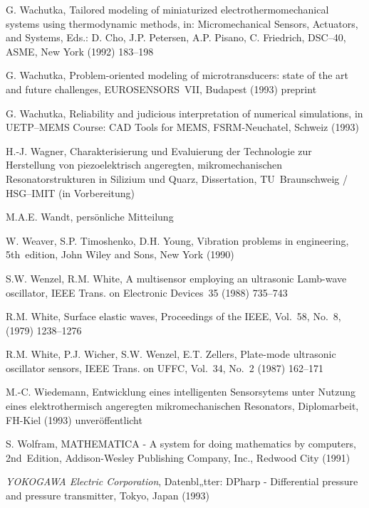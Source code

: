 \begin{thebibliography}{xxx}
 G. Wachutka, Tailored modeling of miniaturized electrothermomechanical
 systems using thermodynamic methods, in: Micromechanical Sensors,
 Actuators, and Systems, Eds.: D. Cho, J.P. Petersen, A.P. Pisano,
 C. Friedrich, DSC--40, ASME, New York (1992) 183--198

 G. Wachutka, Problem-oriented modeling of microtransducers: state of the
 art and future challenges, EUROSENSORS~VII, Budapest (1993) preprint

  G. Wachutka, Reliability and judicious interpretation of numerical
  simulations, in UETP--MEMS Course: CAD Tools for MEMS, FSRM-Neuchatel,
  Schweiz (1993)

 H.-J. Wagner, Charakterisierung und Evaluierung der Technologie zur
 Herstellung von piezoelektrisch angeregten, mikromechanischen
 Resonatorstrukturen in Silizium und Quarz, Dissertation,
 TU~Braunschweig / HSG--IMIT (in Vorbereitung)

 M.A.E. Wandt, persönliche Mitteilung

 W. Weaver, S.P. Timoshenko, D.H. Young, Vibration problems in engineering,
 5th~edition, John Wiley and Sons, New York (1990)

 S.W. Wenzel, R.M. White, A multisensor employing an ultrasonic Lamb-wave
 oscillator, IEEE Trans. on Electronic Devices~35 (1988) 735--743

 R.M. White, Surface elastic waves, Proceedings of the IEEE, Vol.~58, No.~8,
 (1979) 1238--1276

 R.M. White, P.J. Wicher, S.W. Wenzel, E.T. Zellers, Plate-mode ultrasonic
 oscillator sensors, IEEE Trans. on UFFC, Vol.~34, No.~2 (1987) 162--171

 M.-C. Wiedemann, Entwicklung eines intelligenten Sensorsytems unter Nutzung
 eines elektrothermisch angeregten mikromechanischen Resonators,
 Diplomarbeit, FH-Kiel (1993) unveröffentlicht

 S. Wolfram, {\sf MATHEMATICA} - A system for doing mathematics by computers,
 2nd~Edition, Addison-Wesley Publishing Company, Inc., Redwood City (1991)

 {\em YOKOGAWA Electric Corporation}, Datenbl„tter: {\sf DPharp} -
 Differential pressure and pressure transmitter, Tokyo, Japan (1993)


\end{thebibliography}
